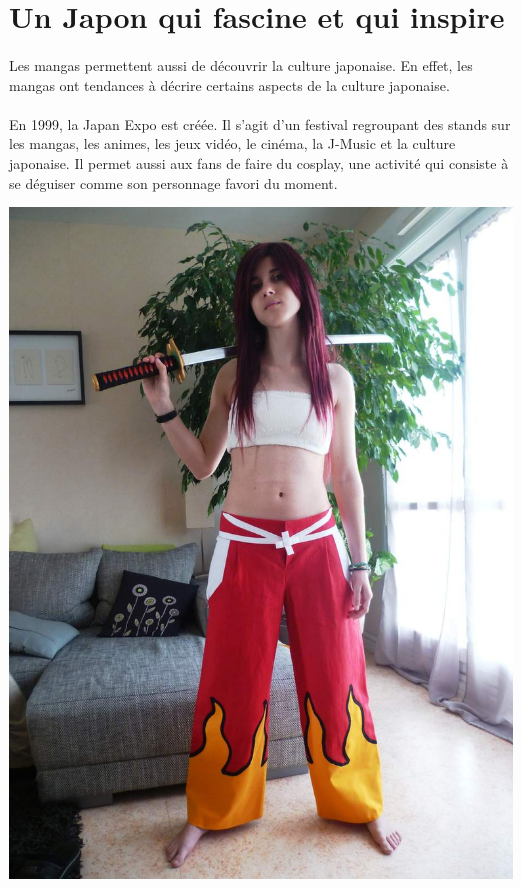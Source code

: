 \section{Un Japon qui fascine et qui inspire}
\paragraph{}
Les mangas permettent aussi de découvrir la culture japonaise. En effet, les mangas ont tendances à décrire certains aspects de la culture japonaise. 
\paragraph{}
En 1999, la Japan Expo est créée. Il s’agit d’un festival regroupant des stands sur les mangas, les animes, les jeux vidéo, le cinéma, la J-Music et la culture japonaise. Il permet aussi aux fans de faire du cosplay, une activité qui consiste à se déguiser comme son personnage favori du moment. 
\begin{center}
\includegraphics[scale=0.3, angle=-90]{erza.jpg}
\end{center}
